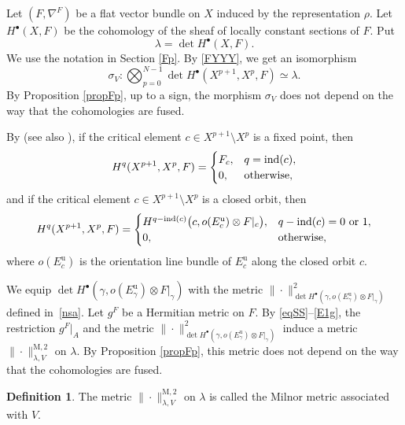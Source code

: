\documentclass[11pt]{article}
\numberwithin{equation}{section}
\newcommand{\sbullet}{{\scriptscriptstyle\bullet}}
\newcommand{\ru}{\mathrm{u}}
\newcommand{\rM}{\mathrm{M}}
\theoremstyle{plain}
\theoremstyle{definition}
\newtheorem{defin}[lem]{Definition}
\theoremstyle{remark}
\DeclareMathOperator{\ind}{ind}
\begin{document}
Let $(F,\nabla^{F})$ be a flat vector bundle on $X$ induced by the representation
$\rho$.
Let $H^{\sbullet}(X,F)$ be the cohomology of the sheaf of locally constant
sections of $F$. Put
\begin{equation}\label{eqlambda}
\lambda=\det H^{\sbullet}(X,F).
\end{equation}
We use the notation in Section \ref{Fp}. By \eqref{FYYY}, we get an isomorphism
\begin{equation}\label{eqSS}
\sigma_{V}:\bigotimes_{p=0}^{N-1}\det
H^{\sbullet}(X^{p+1},X^{p},F)\simeq \lambda.
\end{equation}
By Proposition \ref{propFp}, up to a sign, the
morphism $\sigma_{V}$ does not depend on the way that the
cohomologies are fused.

By \cite[Th.\,9.11]{Franks1982} (see also \cite[\S 2]{MorgadoMorseSmale}), if the critical element $c\in
X^{p+1}\setminus X^{p}$ is a fixed
point, then
\begin{equation}\label{E1x}
H^{q}(X^{p+1},X^{p},F)=
\begin{cases}
F_{c},& q=\ind (c),\\
0,&\hbox{otherwise},
\end{cases}
\end{equation}
and if the critical element $c\in
X^{p+1}\setminus X^{p}$ is a closed orbit, then
\begin{equation}\label{E1g}
H^{q}(X^{p+1},X^{p},F)=
\begin{cases}
H^{q-\ind (c)}\big(c,o(E^{\ru}_{c})\otimes F|_{c}\big),& q-\ind( c)=0
\hbox{ or }1,\\
0,&\hbox{otherwise,}
\end{cases}
\end{equation}
where $o(E_{c}^{\ru})$ is the orientation line bundle of $E^{\ru}_{c}$ along the
closed orbit $c$.

We equip $\det
H^{\sbullet}(\gamma,o(E^{\ru}_{\gamma})\otimes
F|_{\gamma})$ with the metric $\|{\cdot}\|^{2}_{\det
H^{\sbullet}(\gamma,o(E^{\ru}_{\gamma})\otimes
F|_{\gamma})}$ defined in~\eqref{nsa}.
Let $g^{F}$ be a Hermitian metric on $F$. By \eqref{eqSS}--\eqref{E1g}, the
restriction $g^{F}|_{A}$
and the metric $\|{\cdot}\|^{2}_{\det
H^{\sbullet}(\gamma,o(E^{\ru}_{\gamma})\otimes
F|_{\gamma})}$ induce a metric
$\|{\cdot}\|^{\rM,2}_{\lambda,V}$ on
$\lambda$. By Proposition \ref{propFp},
this metric does not depend on the way that the
cohomologies are fused.

\begin{defin}
The metric $\|{\cdot}\|^{\rM,2}_{\lambda,V}$ on
$\lambda$ is called the Milnor metric associated with $V$.
\end{defin}
\end{document}
